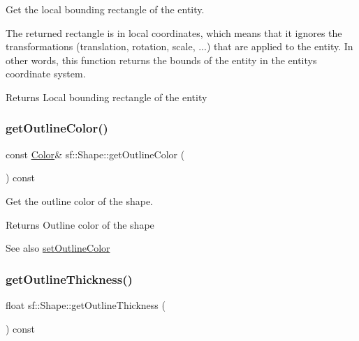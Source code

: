 Get the local bounding rectangle of the entity. 

The returned rectangle is in local coordinates, which means that it ignores the transformations (translation, rotation, scale, ...) that are applied to the entity. In other words, this function returns the bounds of the entity in the entity\textquotesingle{}s coordinate system.

\begin{DoxyReturn}{Returns}
Local bounding rectangle of the entity 
\end{DoxyReturn}
\mbox{\label{classsf_1_1_shape_a6598feed5fea1325a36b0f3a615ac55c}} 
\subsubsection{\texorpdfstring{get\+Outline\+Color()}{getOutlineColor()}}
{\footnotesize\ttfamily const \hyperlink{classsf_1_1_color}{Color}\& sf\+::\+Shape\+::get\+Outline\+Color (\begin{DoxyParamCaption}{ }\end{DoxyParamCaption}) const}



Get the outline color of the shape. 

\begin{DoxyReturn}{Returns}
Outline color of the shape
\end{DoxyReturn}
\begin{DoxySeeAlso}{See also}
\hyperlink{classsf_1_1_shape_a5978f41ee349ac3c52942996dcb184f7}{set\+Outline\+Color} 
\end{DoxySeeAlso}
\mbox{\label{classsf_1_1_shape_a1d4d5299c573a905e5833fc4dce783a7}} 
\subsubsection{\texorpdfstring{get\+Outline\+Thickness()}{getOutlineThickness()}}
{\footnotesize\ttfamily float sf\+::\+Shape\+::get\+Outline\+Thickness (\begin{DoxyParamCaption}{ }\end{DoxyParamCaption}) const}



